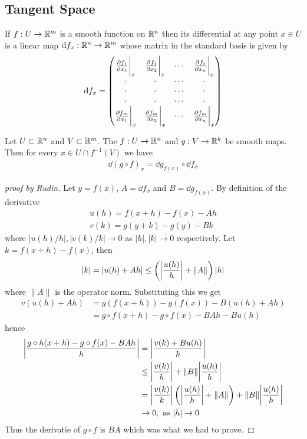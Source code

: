 \subsection{Tangent Space}
\begin{definition}
  If $f:U\to \mathbb{R}^m$ is a smooth function on $\mathbb{R}^n$ then its differential at any point $x\in U$ is a linear map $\dd f_x:\mathbb{R}^n\to \mathbb{R}^m$ whose matrix in the standard basis is given by
  \begin{align*}
    \dd f_x = \begin{pmatrix}
      \pdv{f_1}{x_1}\bigg|_{x} & \pdv{f_1}{x_2}\bigg|_{x} & \cdots & \pdv{f_1}{x_n}\bigg|_{x}\\
      \cdot & \cdot & \cdots & \cdot\\
      \cdot & \cdot & \cdots & \cdot\\
      \cdot & \cdot & \cdots & \cdot\\
      \pdv{f_m}{x_1}\bigg|_{x} & \pdv{f_m}{x_2}\bigg|_{x} & \cdots & \pdv{f_m}{x_n}\bigg|_{x}
    \end{pmatrix}
  \end{align*}
\end{definition}
\begin{proposition}
  Let $U \subset \mathbb{R}^n$ and $V\subset \mathbb{R}^m$. The $f:U\to \mathbb{R}^n$ and $g:V\to \mathbb{R}^k$ be smooth maps. Then for every $x\in U\cap f^{-1}(V)$ we have
  \begin{align*}
    \dd (g\circ f)_x = \dd g_{f(x)} \circ \dd f_x
  \end{align*}
\end{proposition}
\begin{proof}[proof by Rudin]
  Let $y = f(x)$, $A = \dd f_x$ and $B = \dd g_{f(x)}$. By definition of the derivative
  \begin{align*}
    u(h) = f(x+h) - f(x) - Ah\\
    v(k) = g(y+k) - g(y) - Bk
  \end{align*}
  where $|u(h)/h|, |v(k)/k| \to 0$ as $|h|,|k|\to 0$ respectively. Let $k = f(x+h) - f(x)$, then
  \begin{align*}
    |k| = |u(h) + Ah| \leq \left( \bigg|\frac{u(h)}{h}\bigg| + \|A\| \right) |h|
  \end{align*}
  where $\|A\|$ is the operator norm. Substituting this we get
  \begin{align*}
    v(u(h) + Ah) &= g(f(x+h)) - g(f(x)) - B(u(h) + Ah)\\
                 &= g\circ f(x+h) - g\circ f(x) - BAh - Bu(h)
  \end{align*}
  hence
  \begin{align*}
    \bigg| \f{g\circ h(x+h) - g\circ f(x) - BAh}{h}\bigg| &= \bigg|\f{v(k) + B u(h)}{h}\bigg|\\
                                        &\leq \bigg|\f{v(k)}{h}\bigg| + \|B\|\bigg|\f{u(h)}{h}\bigg|\\
                                        &= \bigg|\f{v(k)}{k}\bigg|\l(\bigg|\f{u(h)}{h}\bigg| + \|A\|\r) + \|B\|\bigg|\f{u(h)}{h}\bigg|\\
                                        &\rightarrow 0,\ \text{as}\ |h|\to 0
  \end{align*}
  Thus the derivatie of $g\circ f$ is $BA$ which was what we had to prove.
\end{proof}
